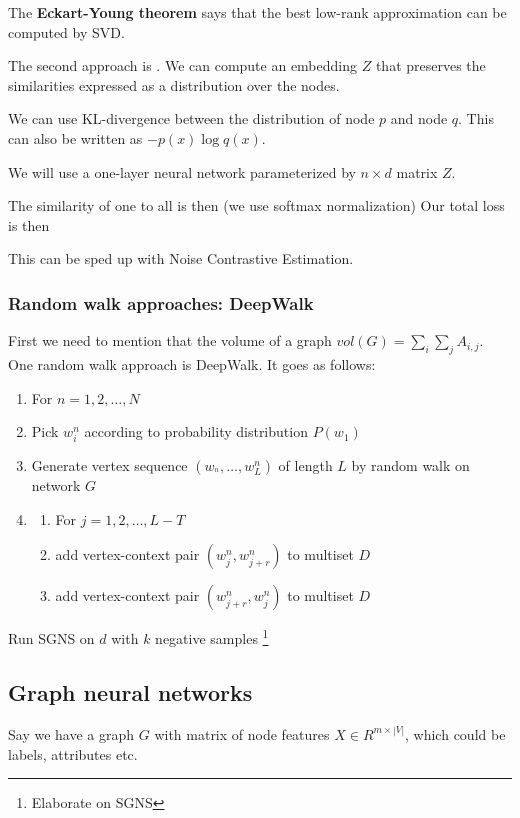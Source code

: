     The \textbf{Eckart-Young theorem} says that the best low-rank approximation can be computed by SVD. 
    
    The second approach is . We can compute an embedding $Z$ that preserves the similarities expressed as a distribution over the nodes. 
    
    We can use KL-divergence between the distribution of node $p$ and node $q$. 
    This can also be written as $-p(x) \log q(x)$.
    
    We will use a one-layer neural network parameterized by $n \times d$ matrix $Z$. 
    
    The similarity of one to all is then (we use softmax normalization) 
    Our total loss is then
    
    This can be sped up with Noise Contrastive Estimation.
    
\subsubsection{Random walk approaches: DeepWalk}
    First we need to mention that the volume of a graph $vol(G) = \sum_{i} \sum_j A_{i,j}$. One random walk approach is DeepWalk. It goes as follows:
    \begin{enumerate}
        \item For $n = 1, 2, \dots, N$
        \item Pick $w_i^n$ according to probability distribution $P(w_1)$
        \item Generate vertex sequence $(w_^n, \dots, w_L^n)$ of length $L$ by random walk on network $G$
        \item \begin{enumerate}
            \item For $j = 1, 2, \dots, L - T$ 
            \item add vertex-context pair $(w_j^n, w_{j+r}^n)$ to multiset $D$
            \item add vertex-context pair $(w_{j+r}^n, w_j^n)$ to multiset $D$
        \end{enumerate}
    \end{enumerate}
    Run SGNS on $d$ with $k$ negative samples \footnote{Elaborate on SGNS}
    
\subsection{Graph neural networks}
    Say we have a graph $G$ with matrix of node features $X \in R^{m \times |V|}$, which could be labels, attributes etc. 
    
